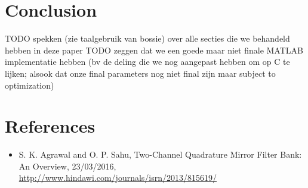 \documentclass[a4paper]{article}
\begin{document}
\section{Conclusion}
TODO spekken (zie taalgebruik van bossie) over alle secties die we behandeld hebben in deze paper
TODO zeggen dat we een goede maar niet finale MATLAB implementatie hebben (bv de deling die we nog aangepast hebben om op C te lijken; alsook dat onze final parameters nog niet final zijn maar subject to optimization)

\section{References}
\begin{itemize}
\item S. K. Agrawal and O. P. Sahu, Two-Channel Quadrature Mirror Filter Bank: An Overview, 23/03/2016, \url{http://www.hindawi.com/journals/isrn/2013/815619/}
\end{itemize}
\end{document}
